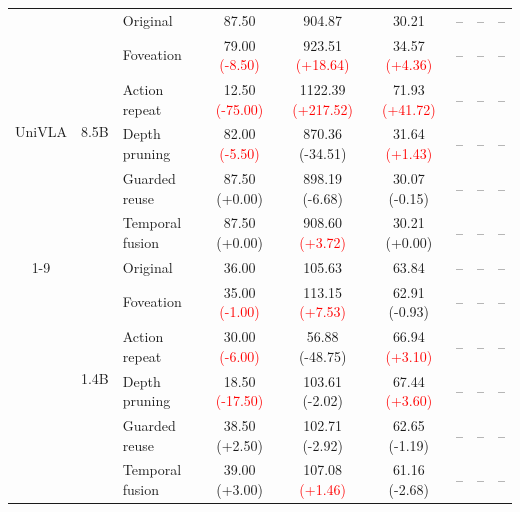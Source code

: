 \begin{table}[t]
\begin{tabular}{cclcccccc}
\multirow[c]{6}{*}{UniVLA}
& \multirow[c]{6}{*}{8.5B}
& Original & 87.50 & 904.87 & 30.21 & -- & -- & -- \\
& & Foveation & 79.00 {\scriptsize\textcolor{red}{(-8.50)}} & 923.51 {\scriptsize\textcolor{red}{(+18.64)}} & 34.57 {\scriptsize\textcolor{red}{(+4.36)}} & -- & -- & -- \\
& & Action repeat & 12.50 {\scriptsize\textcolor{red}{(-75.00)}} & 1122.39 {\scriptsize\textcolor{red}{(+217.52)}} & 71.93 {\scriptsize\textcolor{red}{(+41.72)}} & -- & -- & -- \\
& & Depth pruning & 82.00 {\scriptsize\textcolor{red}{(-5.50)}} & 870.36 {\scriptsize\textcolor{green!50!black}{(-34.51)}} & 31.64 {\scriptsize\textcolor{red}{(+1.43)}} & -- & -- & -- \\
& & Guarded reuse & 87.50 {\scriptsize\textcolor{green!50!black}{(+0.00)}} & 898.19 {\scriptsize\textcolor{green!50!black}{(-6.68)}} & 30.07 {\scriptsize\textcolor{green!50!black}{(-0.15)}} & -- & -- & -- \\
& & Temporal fusion & 87.50 {\scriptsize\textcolor{green!50!black}{(+0.00)}} & 908.60 {\scriptsize\textcolor{red}{(+3.72)}} & 30.21 {\scriptsize\textcolor{green!50!black}{(+0.00)}} & -- & -- & -- \\
\cmidrule(lr){1-9}

\multirow[c]{6}{*}{MiniVLA}
& \multirow[c]{6}{*}{1.4B}
& Original & 36.00 & 105.63 & 63.84 & -- & -- & -- \\
& & Foveation & 35.00 {\scriptsize\textcolor{red}{(-1.00)}} & 113.15 {\scriptsize\textcolor{red}{(+7.53)}} & 62.91 {\scriptsize\textcolor{green!50!black}{(-0.93)}} & -- & -- & -- \\
& & Action repeat & 30.00 {\scriptsize\textcolor{red}{(-6.00)}} & 56.88 {\scriptsize\textcolor{green!50!black}{(-48.75)}} & 66.94 {\scriptsize\textcolor{red}{(+3.10)}} & -- & -- & -- \\
& & Depth pruning & 18.50 {\scriptsize\textcolor{red}{(-17.50)}} & 103.61 {\scriptsize\textcolor{green!50!black}{(-2.02)}} & 67.44 {\scriptsize\textcolor{red}{(+3.60)}} & -- & -- & -- \\
& & Guarded reuse & 38.50 {\scriptsize\textcolor{green!50!black}{(+2.50)}} & 102.71 {\scriptsize\textcolor{green!50!black}{(-2.92)}} & 62.65 {\scriptsize\textcolor{green!50!black}{(-1.19)}} & -- & -- & -- \\
& & Temporal fusion & 39.00 {\scriptsize\textcolor{green!50!black}{(+3.00)}} & 107.08 {\scriptsize\textcolor{red}{(+1.46)}} & 61.16 {\scriptsize\textcolor{green!50!black}{(-2.68)}} & -- & -- & -- \\
\bottomrule
\end{tabular}
\end{table}
